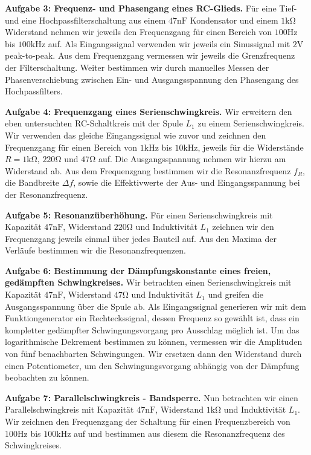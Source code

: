 \textbf{Aufgabe 3: Frequenz- und Phasengang eines RC-Glieds.} Für eine Tief- und eine Hochpassfilterschaltung aus einem $47\si{\nano\farad}$ Kondensator und einem $1 \si{\kilo\ohm}$ Widerstand nehmen wir jeweils den Frequenzgang für einen Bereich von $100\si{\hertz}$ bis $100\si{\kilo\hertz}$ auf. Als Eingangssignal verwenden wir jeweils ein Sinussignal mit $2 \si{\volt}$ peak-to-peak. Aus dem Frequenzgang vermessen wir jeweils die Grenzfrequenz der Filterschaltung. Weiter bestimmen wir durch manuelles Messen der Phasenverschiebung zwischen Ein- und Ausgangsspannung den Phasengang des Hochpassfilters.

\textbf{Aufgabe 4: Frequenzgang eines Serienschwingkreis.} Wir erweitern den eben untersuchten RC-Schaltkreis mit der Spule $L_1$ zu einem Serienschwingkreis. Wir verwenden das gleiche Eingangssignal wie zuvor und zeichnen den Frequenzgang für einen Bereich von $1 \si{\kilo\hertz}$ bis $10 \si{\kilo\hertz}$, jeweils für die Widerstände $R = 1 \si{\kilo\ohm}$, $220 \si{\ohm}$ und $47 \si{\ohm}$ auf. Die Ausgangsspannung nehmen wir hierzu am Widerstand ab. Aus dem Frequenzgang bestimmen wir die Resonanzfrequenz $f_R$, die Bandbreite $\Delta f$, sowie die Effektivwerte der Aus- und Eingangsspannung bei der Resonanzfrequenz.

\textbf{Aufgabe 5: Resonanzüberhöhung.} Für einen Serienschwingkreis mit Kapazität $47 \si{\nano\farad}$, Widerstand $220 \si{\ohm}$ und Induktivität $L_1$ zeichnen wir den Frequenzgang jeweils einmal über jedes Bauteil auf. Aus den Maxima der Verläufe bestimmen wir die Resonanzfrequenzen.

\textbf{Aufgabe 6: Bestimmung der Dämpfungskonstante eines freien, gedämpften Schwingkreises.} Wir betrachten einen Serienschwingkreis mit Kapazität $47 \si{\nano\farad}$, Widerstand $47 \si{\ohm}$ und Induktivität $L_1$ und greifen die Ausgangsspannung über die Spule ab. Als Eingangssignal generieren wir mit dem Funktiongenerator ein Rechteckssignal, dessen Frequenz so gewählt ist, dass ein kompletter gedämpfter Schwingungsvorgang pro Ausschlag möglich ist. Um das logarithmische Dekrement bestimmen zu können, vermessen wir die Amplituden von fünf benachbarten Schwingungen. Wir ersetzen dann den Widerstand durch einen Potentiometer, um den Schwingungsvorgang abhängig von der Dämpfung beobachten zu können.

\textbf{Aufgabe 7: Parallelschwingkreis - Bandsperre.} Nun betrachten wir einen Parallelschwingkreis mit Kapazität $47 \si{\nano\farad}$, Widerstand $1 \si{\kilo\ohm}$ und Induktivität $L_1$. Wir zeichnen den Frequenzgang der Schaltung für einen Frequenzbereich von $100 \si{\hertz}$ bis $100 \si{\kilo\hertz}$ auf und bestimmen aus diesem die Resonanzfrequenz des Schwingkreises.

